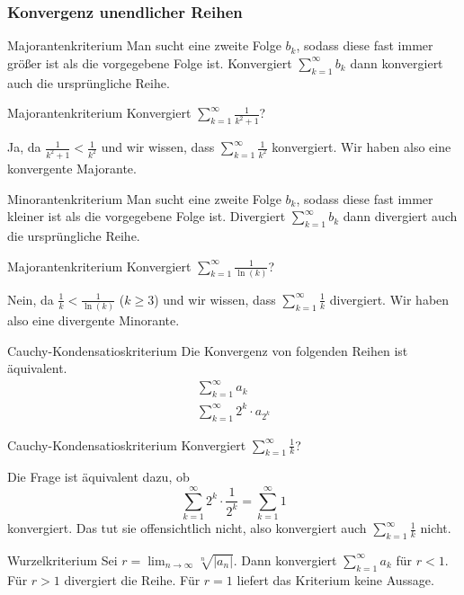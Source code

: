 \documentclass[german]{../spicker}
\begin{document}
\subsubsection{Konvergenz unendlicher Reihen}
\begin{algo}{Majorantenkriterium}
    Man sucht eine zweite Folge $b_k$, sodass diese fast immer größer ist als die vorgegebene Folge ist.
    Konvergiert $\sum_{k=1}^{\infty} b_k$ dann konvergiert auch die ursprüngliche Reihe.
\end{algo}
\begin{example}{Majorantenkriterium}
    Konvergiert $\sum_{k=1}^{\infty} \frac{1}{k^2+1}$?

    Ja, da $\frac{1}{k^2+1} < \frac{1}{k^2}$ und wir wissen, dass $\sum_{k=1}^{\infty} \frac{1}{k^2}$ konvergiert.
    Wir haben also eine konvergente Majorante.
\end{example}
\begin{algo}{Minorantenkriterium}
    Man sucht eine zweite Folge $b_k$, sodass diese fast immer kleiner ist als die vorgegebene Folge ist.
    Divergiert $\sum_{k=1}^{\infty} b_k$ dann divergiert auch die ursprüngliche Reihe.
\end{algo}
\begin{example}{Majorantenkriterium}
    Konvergiert $\sum_{k=1}^{\infty} \frac{1}{\ln(k)}$?

    Nein, da $\frac{1}{k} < \frac{1}{\ln(k)}$ ($k\geq3$) und wir wissen, dass $\sum_{k=1}^{\infty} \frac{1}{k}$ divergiert.
    Wir haben also eine divergente Minorante.
\end{example}
\begin{algo}{Cauchy-Kondensatioskriterium}
    Die Konvergenz von folgenden Reihen ist äquivalent.
    $$
        \begin{aligned}
            \sum_{k=1}^{\infty} a_k \\
            \sum_{k=1}^{\infty} 2^k \cdot a_{2^k}
        \end{aligned}
    $$
\end{algo}
\begin{example}{Cauchy-Kondensatioskriterium}
    Konvergiert $\sum_{k=1}^{\infty} \frac{1}{k}$?

    Die Frage ist äquivalent dazu, ob
    \[
        \sum_{k=1}^{\infty} 2^k \cdot \frac{1}{2^k} = \sum_{k=1}^{\infty} 1
    \]
    konvergiert. Das tut sie offensichtlich nicht, also konvergiert auch $\sum_{k=1}^{\infty} \frac{1}{k}$ nicht.
\end{example}
\begin{algo}{Wurzelkriterium}
    Sei $r = \lim_{n\to\infty} \sqrt[n]{|a_n|}$.
    Dann konvergiert $\sum_{k=1}^{\infty} a_k$ für $r<1$.
    Für $r>1$ divergiert die Reihe.
    Für $r=1$ liefert das Kriterium keine Aussage.
\end{algo}
\end{document}
